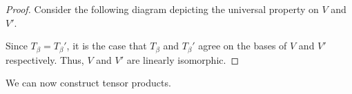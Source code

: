 \documentclass[10pt]{mypackage}
\begin{document}
\begin{proof}
  Consider the following diagram depicting the universal property on $V$ and $V'$.
  \begin{center}
  \end{center}
  Since $T_{\beta} = T_{\beta}'$, it is the case that $T_{\beta}$ and $T_{\beta}'$ agree on the bases of $V$ and $V'$ respectively. Thus, $V$ and $V'$ are linearly isomorphic.
\end{proof}
We can now construct tensor products.\newline
\end{document}
